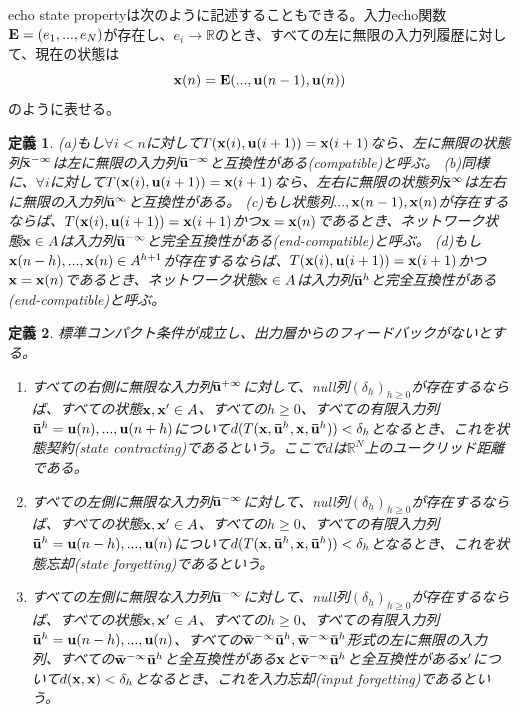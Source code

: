 \documentclass{jsarticle}
\newtheorem{dfn}{定義}
\begin{document}
echo state propertyは次のように記述することもできる。入力echo関数${\bf E}=(e_{1},...,e_{N})$が存在し、$e_{i} \rightarrow \mathbb{R}$のとき、すべての左に無限の入力列履歴に対して、現在の状態は
\begin{equation}
	{\bf x}(n)={\bf E}(...,{\bf u}(n-1),{\bf u}(n))
\end{equation}
のように表せる。
\begin{dfn}
(a)もし$\forall i< n$に対して$T({\bf x}(i),{\bf u}(i+1))={\bf x}(i+1)$なら、左に無限の状態列${\bf \bar x}^{- \infty}$は左に無限の入力列${\bf \bar u}^{- \infty}$と互換性がある(compatible)と呼ぶ。
(b)同様に、$\forall i$に対して$T({\bf x}(i),{\bf u}(i+1))={\bf x}(i+1)$なら、左右に無限の状態列${\bf \bar x}^{\infty}$は左右に無限の入力列${\bf \bar u}^{\infty}$と互換性がある。
(c)もし状態列$...,{\bf x}(n-1),{\bf x}(n)$が存在するならば、$T({\bf x}(i),{\bf u}(i+1))={\bf x}(i+1)$かつ${\bf x}={\bf x}(n)$であるとき、ネットワーク状態${\bf x}\in A$は入力列${\bf \bar u}^{- \infty}$と完全互換性がある(end-compatible)と呼ぶ。
(d)もし${\bf x}(n-h),...,{\bf x}(n) \in A^{h+1}$が存在するならば、$T({\bf x}(i),{\bf u}(i+1))={\bf x}(i+1)$かつ${\bf x}={\bf x}(n)$であるとき、ネットワーク状態${\bf x} \in A$は入力列${\bf \bar u}^{h}$と完全互換性がある(end-compatible)と呼ぶ。
\end{dfn}
\begin{dfn}
標準コンパクト条件が成立し、出力層からのフィードバックがないとする。
\begin{enumerate}
\item すべての右側に無限な入力列${\bf \bar u}^{+ \infty}$に対して、null列$(\delta_{h})_{{h}\geq 0}$が存在するならば、すべての状態${\bf x},{\bf x'} \in A$、すべての$h \geq 0$、すべての有限入力列${\bf \bar u}^{h}={\bf u}(n),...,{\bf u}(n+h)$について$d(T({\bf x},{\bf \bar u}^{h},{\bf x},{\bf \bar u}^{h}))<\delta_{h}$となるとき、これを状態契約(state contracting)であるという。ここで$d$は$\mathbb{R}^{N}$上のユークリッド距離である。

\item すべての左側に無限な入力列${\bf \bar u}^{- \infty}$に対して、null列$(\delta_{h})_{{h}\geq 0}$が存在するならば、すべての状態${\bf x},{\bf x'} \in A$、すべての$h \geq 0$、すべての有限入力列${\bf \bar u}^{h}={\bf u}(n-h),...,{\bf u}(n)$について$d(T({\bf x},{\bf \bar u}^{h},{\bf x},{\bf \bar u}^{h}))<\delta_{h}$となるとき、これを状態忘却(state forgetting)であるという。

\item すべての左側に無限な入力列${\bf \bar u}^{- \infty}$に対して、null列$(\delta_{h})_{{h}\geq 0}$が存在するならば、すべての状態${\bf x},{\bf x'} \in A$、すべての$h \geq 0$、すべての有限入力列${\bf \bar u}^{h}={\bf u}(n-h),...,{\bf u}(n)$、すべての${\bf \bar w^{- \infty}}{\bf \bar u}^{h},{\bf \bar w^{- \infty}}{\bf \bar u}^{h}$形式の左に無限の入力列、すべての${\bf \bar w^{- \infty}}{\bf \bar u}^{h}$と全互換性がある${\bf x}$と${\bf \bar v^{- \infty}}{\bf \bar u}^{h}$と全互換性がある${\bf x'}$について$d({\bf x},{\bf x})<\delta_{h}$となるとき、これを入力忘却(input forgetting)であるという。
\end{enumerate}
\end{dfn}
\end{document}

